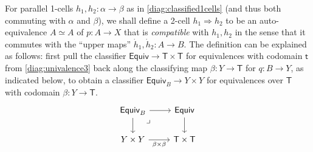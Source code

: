 \documentclass[12pt,reqno]{amsart}
\renewcommand{\to}{\ensuremath{\rightarrow}}
\renewcommand{\t}{\ensuremath{\mathsf{t}}}
\newcommand{\T}{\ensuremath{\mathsf{T}}}
\newcommand{\TT}{\ensuremath{\dot{\mathsf{T}}}}
\newcommand{\pbcorner}{\arrow[dr,phantom,"\lrcorner" very near start, shift right=.5ex]} %
\theoremstyle{remark}
\theoremstyle{definition}
\begin{document}
%
%
For parallel 1-cells $h_1, h_2 : \alpha \to \beta$ as in \eqref{diag:classified1cells} (and thus both commuting with $\alpha$ and $\beta$), we shall define a 2-cell $h_1\Rightarrow h_2$ to be an auto-equivalence $A\simeq A$ of $p :A \to X$ that is \emph{compatible} with $h_1, h_2$ in the sense that it commutes with the ``upper maps'' $\dot{h}_1, \dot{h}_2 : A \to B$.  The definition can be explained as follows: first pull the classifier $\mathsf{Equiv} \to \T\times\T$ for equivalences with codomain $\t$ from \eqref{diag:univalence3} back along the classifying map $\beta : Y\to \T$ for $q : B \to Y$, as indicated below, to obtain a classifier $\mathsf{Equiv}_B \to Y\times Y$ for equivalences over $\T$ with codomain $\beta : Y \to \T$.
\begin{equation}\label{eq:pulledbackclassifier}
\begin{tikzcd}
	\mathsf{Equiv}_B \ar[d] \ar[r]  \pbcorner & \mathsf{Equiv} \ar[d] \\  
	Y\times Y \ar[r,swap,"{\beta \times \beta}"] &  \T \times \T
 \end{tikzcd}
 \end{equation}
 
\end{document}
